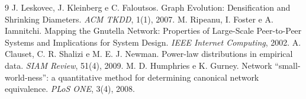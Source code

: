 \documentclass[10pt,a4paper,twocolumn]{article}
\begin{document}
\nocite{clauset2009,humphries2008}
\begin{thebibliography}{9}
 J. Leskovec, J. Kleinberg e C. Faloutsos. Graph Evolution: Densification and Shrinking Diameters. \emph{ACM TKDD}, 1(1), 2007.
 M. Ripeanu, I. Foster e A. Iamnitchi. Mapping the Gnutella Network: Properties of Large-Scale Peer-to-Peer Systems and Implications for System Design. \emph{IEEE Internet Computing}, 2002.
 A. Clauset, C. R. Shalizi e M. E. J. Newman. Power-law distributions in empirical data. \emph{SIAM Review}, 51(4), 2009.
 M. D. Humphries e K. Gurney. Network ``small-world-ness'': a quantitative method for determining canonical network equivalence. \emph{PLoS ONE}, 3(4), 2008.
\end{thebibliography}
\end{document}
